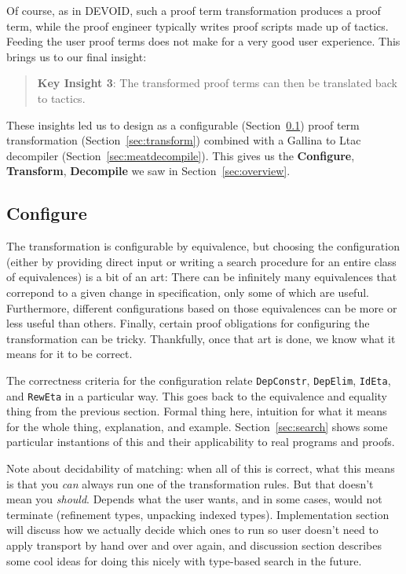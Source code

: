 Of course, as in \textsc{DEVOID}, such a proof term transformation produces a proof term,
while the proof engineer typically writes proof scripts made up of tactics.
Feeding the user proof terms does not make for a very good user experience.
This brings us to our final insight:

\begin{quote}
\textbf{Key Insight 3}: The transformed proof terms can then be translated back to tactics.
\end{quote} 

These insights led us to design \toolname as a configurable (Section~\ref{sec:art}) proof term transformation (Section~\ref{sec:transform})
combined with a Gallina to Ltac decompiler (Section~\ref{sec:meatdecompile}).
This gives us the \textbf{Configure}, \textbf{Transform}, \textbf{Decompile} we saw in Section~\ref{sec:overview}.

\subsection{Configure}
\label{sec:art}

The transformation is configurable by equivalence, but choosing the configuration (either by providing direct input or writing a 
search procedure for an entire class of equivalences) is a bit of an art: There can be infinitely many equivalences that correpond to a 
given change in specification, only some of which are useful. Furthermore, different configurations based on those equivalences
can be more or less useful than others. Finally, certain proof obligations for configuring the transformation can be tricky.
Thankfully, once that art is done, we know what it means for it to be correct.

The correctness criteria for the configuration relate \lstinline{DepConstr}, \lstinline{DepElim}, \lstinline{IdEta}, and \lstinline{RewEta}
in a particular way.
This goes back to the equivalence and equality thing from the previous section.
Formal thing here, intuition for what it means for the whole thing, explanation, and example.
Section~\ref{sec:search} shows some particular instantions of this and their applicability to real programs and proofs.


Note about decidability of matching: when all of this is correct, what this means is that you \textit{can} always
run one of the transformation rules. But that doesn't mean you \textit{should}. Depends what the user wants,
and in some cases, would not terminate (refinement types, unpacking indexed types). Implementation section will
discuss how we actually decide which ones to run so user doesn't need to apply transport by hand over and over again,
and discussion section describes some cool ideas for doing this nicely with type-based search in the future.

